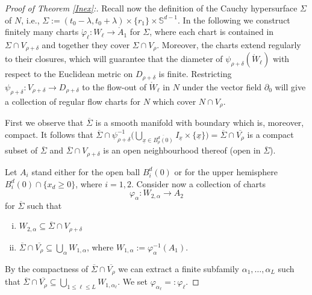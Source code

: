 \documentclass[reqno]{article}
\newcommand{\ux}{\underline{x}}
\newcommand{\Sd}{\mathbb{S}^{d-1}}
\begin{document}
\begin{proof}[Proof of Theorem \ref{Inex}:]
Recall now the definition of the Cauchy hypersurface $\Sigma$ of $N$, i.e., $\Sigma := (t_0 - \lambda, t_0 + \lambda) \times \{r_1\} \times \Sd$. In the following we construct finitely many charts $\mathring{\varphi}_\ell : W_\ell \to \mathring{A}_1$ for $\Sigma$, where each chart is contained in $\Sigma \cap V_{\rho + \delta}$ and together they cover $\Sigma \cap V_\rho$. Moreover, the charts extend regularly to their closures, which will guarantee that the diameter of $\psi_{\rho + \delta}(\mathring{W}_\ell)$ with respect to the Euclidean metric on $D_{\rho + \delta}$ is finite. Restricting $\psi_{\rho + \delta} : V_{\rho + \delta} \to D_{\rho + \delta}$ to the flow-out of $\mathring{W}_\ell$ in $N$ under the vector field $\partial_0$ will give a collection of regular flow charts for $N$ which cover $N \cap V_\rho$. 

First we observe that $\overline{\Sigma}$ is a smooth manifold with boundary which is, moreover, compact. It follows that $\overline{\Sigma} \cap \psi^{-1}_{\rho + \delta} \big( \bigcup_{\ux \in \overline{B^d_{\rho}(0)}} I_{\ux} \times \{\ux\}\big) = \overline{\Sigma} \cap \overline{V_\rho}$ is a compact subset of $\overline{\Sigma}$ and $\overline{\Sigma} \cap V_{\rho + \delta}$ is an open neighbourhood thereof (open in $\overline{\Sigma}$). 
\begin{center}
\def\svgwidth{8cm}

\end{center}
Let $A_i$ stand either for the open ball $B_i^d(0)$ or for the upper hemisphere $B_i^d(0) \cap \{x_d \geq 0\}$, where $i = 1, 2$. Consider now a collection of charts
\begin{equation*}
\varphi_\alpha : W_{2, \alpha} \to A_2
\end{equation*}
for $\overline{\Sigma}$ such that
\begin{enumerate}[i)]
\item $W_{2, \alpha} \subseteq \overline{\Sigma} \cap V_{\rho + \delta}$
\item $\overline{\Sigma} \cap \overline{V_{\rho}} \subseteq \bigcup_{\alpha} W_{1,\alpha}$, where $W_{1, \alpha} := \varphi_{\alpha}^{-1}(A_1)$.
\end{enumerate}
By the compactness of $\overline{\Sigma} \cap \overline{V_\rho}$ we can extract a finite subfamily $\alpha_1, \ldots, \alpha_L$ such that $ \overline{\Sigma} \cap \overline{V_{\rho}}\subseteq \bigcup_{1 \leq \ell \leq L} W_{1, \alpha_\ell}$. We set $\varphi_{\alpha_\ell} =: \varphi_\ell$.


\end{proof}
\end{document}
